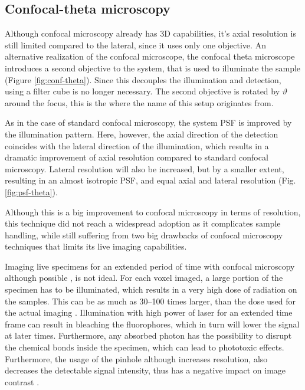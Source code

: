   \subsection{Confocal-theta microscopy}

    Although confocal microscopy already has 3D capabilities, it's axial resolution is still limited compared to the lateral, since it uses only one objective. An alternative realization of the confocal microscope, the confocal theta microscope \cite{stelzer_fundamental_1994} introduces a second objective to the system, that is used to illuminate the sample (Figure \ref{fig:conf-theta}). Since this decouples the illumination and detection, using a filter cube is no longer necessary. The second objective is rotated by $\vartheta$ around the focus, this is the where the name of this setup originates from.

    As in the case of standard confocal microscopy, the system PSF is improved by the illumination pattern. Here, however, the axial direction of the detection coincides with the lateral direction of the illumination, which results in a dramatic improvement of axial resolution compared to standard confocal microscopy. Lateral resolution will also be increased, but by a smaller extent, resulting in an almost isotropic PSF, and equal axial and lateral resolution (Fig. \ref{fig:psf-theta}). 

    Although this is a big improvement to confocal microscopy in terms of resolution, this technique did not reach a widespread adoption as it complicates sample handling, while still suffering from two big drawbacks of confocal microscopy techniques that limits its live imaging capabilities.

    Imaging live specimens for an extended period of time with confocal microscopy although possible \cite{aldaz_live_2010, maitre_asymmetric_2016}, is not ideal. For each voxel imaged, a large portion of the specimen has to be illuminated, which results in a very high dose of radiation on the samples. This can be as much as 30--100 times larger, than the dose used for the actual imaging \cite{reynaud_light_2008}. Illumination with high power of laser for an extended time frame can result in bleaching the fluorophores, which in turn will lower the signal at later times. Furthermore, any absorbed photon has the possibility to disrupt the chemical bonds inside the specimen, which can lead to phototoxic effects. Furthermore, the usage of the pinhole although increases resolution, also decreases the detectable signal intensity, thus has a negative impact on image contrast \cite{stelzer_contrast_1998}.




